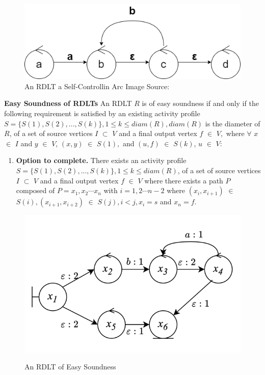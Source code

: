 \begin{figure}[H]
    \centering
    \includegraphics[width=12cm]{figures/Self-Controlling Loop.png}
    \caption{An RDLT a Self-Controllin Arc Image Source: \cite{Ramirez2024}}
    \label{SelfControllingArc}
\end{figure}

\begin{defn}\textbf{Easy Soundness of RDLTs}
    \label{EasyRDLTDef}
    \cite{Ramirez2024}
    An RDLT $ R $ is of easy soundness if and only if the following requirement is satisfied by an existing activity profile $ S = \{S(1), S(2), ..., S(k)\}, 1 \leq k \leq diam(R), diam(R) $ is the diameter of $ R $, of a set of source vertices $ I $ $ \subset $ $ V $ and a final output vertex $ f $ $ \in $ $ V, $ where $ \forall $ $ x $ $ \in $ $ I $ and $ y $ $ \in $ $ V $, $ (x,y) $ $ \in $ $ S(1), $ and $ (u,f) $ $ \in $ $ S(k) $, $ u $ $ \in $ $ V $:
    \begin{enumerate}
        \item \textbf{Option to complete.} There exists an activity profile $ S = \{S(1), S(2), ..., S(k)\}, 1 \leq k \leq diam(R) $, of a set of source vertices $ I $ $ \subset $ $ V $ and a final output vertex $ f $ $ \in $ $ V $ where there exists a path $ P $ composed of $ P = x_1, x_2 \cdots x_n $ with $ i = 1, 2 \cdots n - 2 $ where $ (x_i, x_{i+1}) $ $ \in $ $ S(i), (x_{i+1}, x_{i+2}) $ $ \in $ $ S(j), i < j, x_i = s $ and $ x_n = f $.
    \end{enumerate}
\end{defn}

\begin{figure}[H]
    \cite{Ramirez2024}
    \centering
    \includegraphics[width=12cm]{figures/easySoundRDLT.png}
    \caption{An RDLT of Easy Soundness}
    \label{RDLTEasy}

\end{figure}

